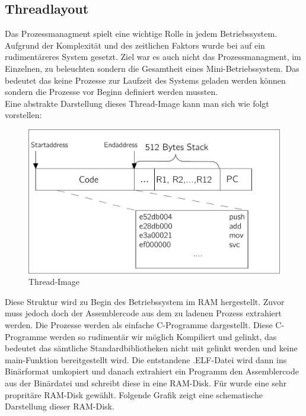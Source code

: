 \subsection{Threadlayout}
Das Prozessmanagment spielt eine wichtige Rolle in jedem Betriebssystem. Aufgrund der Komplexit\"at und des zeitlichen Faktors wurde bei \mops auf ein rudiment\"areres System gesetzt. Ziel war es auch nicht das Prozessmanagment, im Einzelnen, zu beleuchten sondern die Gesamtheit eines Mini-Betriebssystem. Das bedeutet das keine Prozesse zur Laufzeit des Systems geladen werden k\"onnen sondern die Prozesse vor Beginn definiert werden mussten.\\
Eine abstrakte Darstellung dieses Thread-Image kann man sich wie folgt vorstellen:
\begin{figure}[H]
	\begin{center}	
	\caption{Thread-Image}
	\includegraphics[scale=0.60]{common/threadimage.pdf}
	\end{center}
\end{figure}
\noindent
Diese Struktur wird zu Begin des Betriebssystem im RAM hergestellt. Zuvor muss jedoch doch der Assemblercode aus dem zu ladenen Prozess extrahiert werden. Die Prozesse werden als einfache C-Programme dargestellt. Diese C-Programme werden so rudiment\"ar wir m\"oglich Kompiliert und gelinkt, das bedeutet das s\"amtliche Standardbibliotheken nicht mit gelinkt werden und keine main-Funktion bereitgestellt wird. Die entstandene .ELF-Datei wird dann ins Bin\"arformat umkopiert und danach extrahiert ein Programm den Assemblercode aus der Bin\"ardatei und schreibt diese in eine RAM-Disk. F\"ur \mops wurde eine sehr proprit\"are RAM-Disk gew\"ahlt. Folgende Grafik zeigt eine schematische Darstellung dieser RAM-Disk. 
